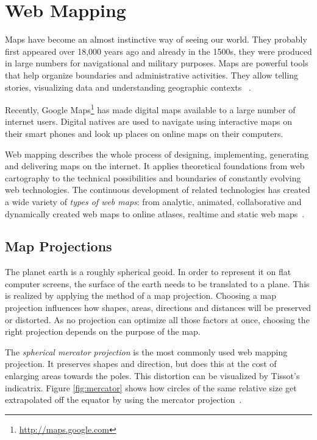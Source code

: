 
%
%

\section{Web Mapping}

Maps have become an almost instinctive way of seeing our world. They probably first appeared over 18,000 years ago and already in the 1500s, they were produced in large numbers for navigational and military purposes. Maps are powerful tools that help organize boundaries and administrative activities. They allow telling stories, visualizing data and understanding geographic contexts
~\cite{Zzolo11mappingdrupal}.

Recently, Google Maps\footnote{\url{http://maps.google.com}} has made digital maps available to a large number of internet users. Digital natives are used to navigate using interactive maps on their smart phones and look up places on online maps on their computers.

Web mapping describes the whole process of designing, implementing, generating and delivering maps on the internet. It applies theoretical foundations from web cartography to the technical possibilities and boundaries of constantly evolving web technologies. The continuous development of related technologies has created a wide variety of \textit{types of web maps}: from analytic, animated, collaborative and dynamically created web maps to online atlases, realtime and static web maps~\cite{wiki:web-mapping}.

\subsection{Map Projections}

The planet earth is a roughly spherical geoid. In order to represent it on flat computer screens, the surface of the earth needs to be translated to a plane. This is realized by applying the method of a map projection. Choosing a map projection influences how shapes, areas, directions and distances will be preserved or distorted. As no projection can optimize all those factors at once, choosing the right projection depends on the purpose of the map.

The \textit{spherical mercator projection} is the most commonly used web mapping projection. It preserves shapes and direction, but does this at the cost of enlarging areas towards the poles. This distortion can be visualized by Tissot's indicatrix. Figure \ref{fig:mercator} shows how circles of the same relative size get extrapolated off the equator by using the mercator projection~\cite{Zzolo11mappingdrupal, wiki:web-mapping}. 

